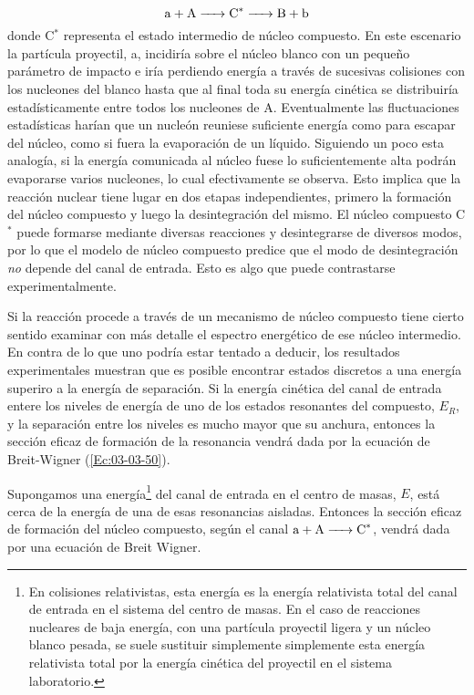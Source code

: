 \begin{equation}
	\ce{a + A -> C^* -> B + b}
\end{equation}
donde C$^*$ representa el estado intermedio de núcleo compuesto. En este escenario la partícula proyectil, a, incidiría sobre el núcleo blanco con un pequeño parámetro de impacto e iría perdiendo energía a través de sucesivas colisiones con los nucleones del blanco hasta que al final toda su energía cinética se distribuiría estadísticamente entre todos los nucleones de A. Eventualmente las fluctuaciones estadísticas harían que un nucleón reuniese suficiente energía como para escapar del núcleo, como si fuera la evaporación de un líquido. Siguiendo un poco esta analogía, si la energía comunicada al núcleo fuese lo suficientemente alta podrán evaporarse varios nucleones, lo cual efectivamente se observa. Esto implica que la reacción nuclear tiene lugar en dos etapas independientes, primero la formación del núcleo compuesto y luego la desintegración del mismo. El núcleo compuesto C$^*$ puede formarse mediante diversas reacciones y desintegrarse de diversos modos, por lo que el modelo de núcleo compuesto predice que el modo de desintegración \textit{no} depende del canal de entrada. Esto es algo que puede contrastarse experimentalmente.


Si la reacción procede a través de un mecanismo de núcleo compuesto tiene cierto sentido examinar con más detalle el espectro energético de ese núcleo intermedio. En contra de lo que uno podría estar tentado a deducir, los resultados experimentales muestran que es posible encontrar estados discretos a una energía superiro a la energía de separación. Si la energía cinética del canal de entrada entere los niveles de energía de uno de los estados resonantes del compuesto, $E_R$, y la separación entre los niveles es mucho mayor que su anchura, entonces la sección eficaz de formación de la resonancia vendrá dada por la ecuación de Breit-Wigner (\ref{Ec:03-03-50}). 

Supongamos una energía\footnote{En colisiones relativistas, esta energía es la energía relativista total del canal de entrada en el sistema del centro de masas. En el caso de reacciones nucleares de baja energía, con una partícula proyectil ligera y un núcleo blanco pesada, se suele sustituir simplemente simplemente esta energía relativista total por la energía cinética del proyectil en el sistema laboratorio.} del canal de entrada en el centro de masas, $E$, está cerca de la energía de una de esas resonancias aisladas. Entonces la sección eficaz de formación del núcleo compuesto, según el canal $\ce{a + A -> C^*}$, vendrá dada por una ecuación de Breit Wigner.


